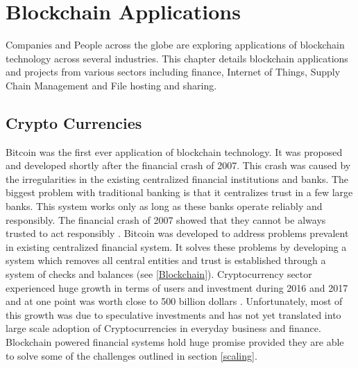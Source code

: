 \section{Blockchain Applications}
Companies and People across the globe are exploring applications of blockchain technology across several industries. This chapter details blockchain applications and projects from various sectors including finance, Internet of Things, Supply Chain Management and File hosting and sharing. 
\vspace{0.5cm}  
\subsection{Crypto Currencies}
Bitcoin was the first ever application of blockchain technology. It was proposed and developed shortly after the financial crash of 2007. This crash was caused by the irregularities in the existing centralized financial institutions and banks. The biggest problem with traditional banking is that it centralizes trust in a few large banks. This system works only as long as these banks operate reliably and responsibly. The financial crash of 2007 showed that they cannot be always trusted to act responsibly \cite{misc:009}. Bitcoin was developed to address problems prevalent in existing centralized financial system. It solves these problems by developing a system which removes all central entities and trust is established through a system of checks and balances (see \ref{Blockchain}). Cryptocurrency sector experienced huge growth in terms of users and investment during 2016 and 2017 and at one point was worth close to 500 billion dollars \cite{misc:010}. Unfortunately, most of this growth was due to speculative investments and has not yet translated into large scale adoption of Cryptocurrencies in everyday business and finance. Blockchain powered financial systems hold huge promise provided they are able to solve some of the challenges outlined in section \ref{scaling}.
\vspace{0.5cm}  
